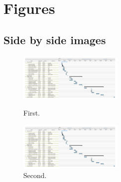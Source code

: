 \section{Figures}

\subsection{Side by side images}

\begin{figure}[H]
\centering
\parbox{5cm}{
\includegraphics[width=5cm]{images/ganttV4horizontal.png}
\caption{First.}
\label{fig:2figsA}}
\qquad
\begin{minipage}{5cm}
\includegraphics[width=5cm]{images/ganttV4horizontal.png}
\caption{Second.}
\label{fig:2figsB}
\end{minipage}
\end{figure}



